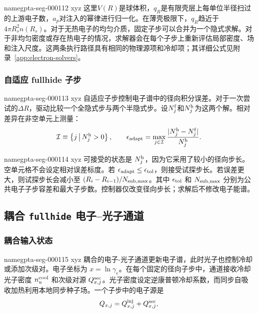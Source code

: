 \documentclass[twocolumn]{aastex702}
\makeatletter
\providecommand{\gptareaderanchor}[1]{\pdfdest name{#1} xyz}%
\providecommand{\gptareaderanchor}[1]{\special{pdf:dest (#1) [ @thispage /XYZ @xpos @ypos null ]}}%
\makeatother
\begin{document}
\gptareaderanchor{gpta-seg-000112}%
这里\(V(R)\)是球体积，\(q_R\)是有限壳层上每单位半径扫过的上游电子数，\(a_p\)对注入的幂律进行归一化。在薄壳极限下，\(q_R\)趋近于\(4\pi R_s^2n(R_s)\)。对于无热电子的均匀介质，固定子步可以合并为一个隐式求解。对于非均匀密度或存在热电子的情况，求解器会在每个子步上重新评估局部密度、场和注入尺度。这两条执行路径具有相同的物理源项和冷却项；其详细公式见附录~\ref{app:electron-solvers}。

\subsubsection{自适应 fullhide 子步}


\gptareaderanchor{gpta-seg-000113}%
自适应子步控制电子谱中的径向积分误差。对于一次尝试的\(\Delta R\)，驱动比较一个全隐式步与两个半隐式步。设\(N_j^{\rm f}\)和\(N_j^{\rm h}\)为这两个解。相对差异在非空单元上测量：
\begin{equation}
\mathcal{I}\equiv
\left\{j\,\middle|\,N_j^{\rm h}>0\right\},
\qquad
\epsilon_{\rm adapt}=
\max_{j\in\mathcal{I}}
\frac{|N_j^{\rm h}-N_j^{\rm f}|}
{N_j^{\rm h}} .
\end{equation}

\gptareaderanchor{gpta-seg-000114}%
可接受的状态是 \(N_j^{\rm h}\)，因为它采用了较小的径向步长。
空单元格不会设定相对误差标度。若 \(\epsilon_{\rm adapt}\le\epsilon_{\rm tol}\)，则接受试探步长。若误差更大，则试探步长会减小至 \((R_i-R_{i-1})/N_{\rm sub,max}\)。其中 \(\epsilon_{\rm tol}\) 和 \(N_{\rm sub,max}\) 分别为公共电子子步容差和最大子步数。控制器仅改变径向步长；求解后不修改电子能谱。

\subsection{耦合 \texttt{fullhide} 电子--光子通道}

\subsubsection{耦合输入状态}


\gptareaderanchor{gpta-seg-000115}%
耦合的电子-光子通道更新电子谱，此时光子也控制冷却或添加次级对。电子坐标为 \(x=\ln\gamma_e\)。在每个固定的径向子步中，通道接收冷却光子密度 \(n_ u^{\rm cool}\) 和次级对源 \(Q_{x,j}^{\rm sec}\)。光子密度设定逆康普顿冷却系数，而同步自吸收加热利用本地同步种子场。一个子步中的电子源是
\begin{equation}
Q_{x,j}=Q_{x,j}^{\rm inj}+Q_{x,j}^{\rm sec},
\end{equation}
\end{document}
